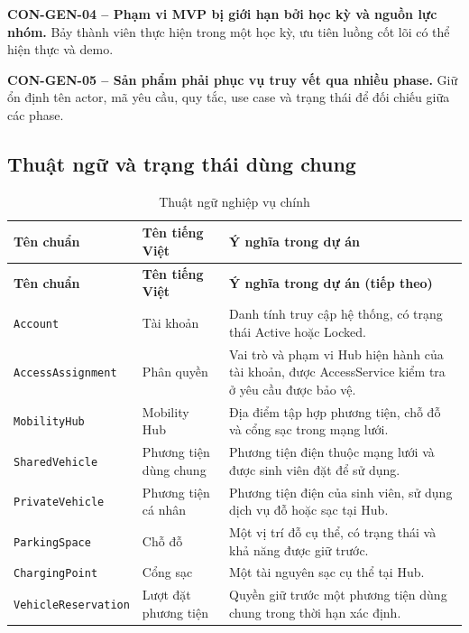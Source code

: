 \medskip
\noindent\textbf{CON-GEN-04 -- Phạm vi MVP bị giới hạn bởi học kỳ và nguồn lực nhóm.} Bảy thành viên thực hiện trong một học kỳ, ưu tiên luồng cốt lõi có thể hiện thực và demo.

\medskip
\noindent\textbf{CON-GEN-05 -- Sản phẩm phải phục vụ truy vết qua nhiều phase.} Giữ ổn định tên actor, mã yêu cầu, quy tắc, use case và trạng thái để đối chiếu giữa các phase.

\subsection{Thuật ngữ và trạng thái dùng chung}

\begingroup
\small
\begin{longtable}{|L{44mm}|L{34mm}|L{62mm}|}
  \caption{Thuật ngữ nghiệp vụ chính}\label{tab:business-terms}\\
  \hline
  \textbf{Tên chuẩn} & \centering\arraybackslash\textbf{Tên tiếng Việt} & \centering\arraybackslash\textbf{Ý nghĩa trong dự án}\\
  \hline
  \endfirsthead
  \hline
  \textbf{Tên chuẩn} & \centering\arraybackslash\textbf{Tên tiếng Việt} & \centering\arraybackslash\textbf{Ý nghĩa trong dự án (tiếp theo)}\\
  \hline
  \endhead
  \texttt{Account} & Tài khoản & Danh tính truy cập hệ thống, có trạng thái Active hoặc Locked.\\
  \hline
  \texttt{AccessAssignment} & Phân quyền & Vai trò và phạm vi Hub hiện hành của tài khoản, được AccessService kiểm tra ở yêu cầu được bảo vệ.\\
  \hline
  \texttt{MobilityHub} & Mobility Hub & Địa điểm tập hợp phương tiện, chỗ đỗ và cổng sạc trong mạng lưới.\\
  \hline
  \texttt{SharedVehicle} & Phương tiện dùng chung & Phương tiện điện thuộc mạng lưới và được sinh viên đặt để sử dụng.\\
  \hline
  \texttt{PrivateVehicle} & Phương tiện cá nhân & Phương tiện điện của sinh viên, sử dụng dịch vụ đỗ hoặc sạc tại Hub.\\
  \hline
  \texttt{ParkingSpace} & Chỗ đỗ & Một vị trí đỗ cụ thể, có trạng thái và khả năng được giữ trước.\\
  \hline
  \texttt{ChargingPoint} & Cổng sạc & Một tài nguyên sạc cụ thể tại Hub.\\
  \hline
  \texttt{VehicleReservation} & Lượt đặt phương tiện & Quyền giữ trước một phương tiện dùng chung trong thời hạn xác định.\\

\end{longtable}
